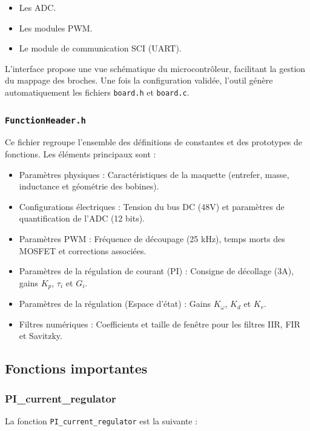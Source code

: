 \begin{itemize}
    \item Les ADC.
    \item Les modules PWM.
    \item Le module de communication SCI (UART).
\end{itemize}

L'interface propose une vue schématique du microcontrôleur, facilitant la gestion du mappage des broches. Une fois la configuration validée, l'outil génère automatiquement les fichiers \texttt{board.h} et \texttt{board.c}.

\subsubsection{\texttt{FunctionHeader.h}}
\label{subsubsec:FunctionHeader}
Ce fichier regroupe l'ensemble des définitions de constantes et des prototypes de fonctions. Les éléments principaux sont :

\begin{itemize}
    \item Paramètres physiques : Caractéristiques de la maquette (entrefer, masse, inductance et géométrie des bobines).
    \item Configurations électriques : Tension du bus DC (48V) et paramètres de quantification de l'ADC (12 bits).
    \item Paramètres PWM : Fréquence de découpage (25 kHz), temps morts des MOSFET et corrections associées.
    \item Paramètres de la régulation de courant (PI) : Consigne de décollage (3A), gains $K_p$, $\tau_i$ et $G_i$.
    \item Paramètres de la régulation (Espace d'état) : Gains $K_\omega$, $K_d$ et $K_r$.
    \item Filtres numériques : Coefficients et taille de fenêtre pour les filtres IIR, FIR et Savitzky.
\end{itemize}

\subsection{Fonctions importantes}

\subsubsection{PI\_current\_regulator}
La fonction \texttt{PI\_current\_regulator} est la suivante :

